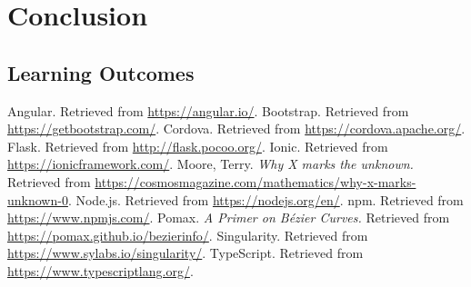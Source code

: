 \documentclass[12pt]{report}
\begin{document}
\chapter{Conclusion}
    \section{Learning Outcomes}

\begin{thebibliography}{9}
     Angular. Retrieved from \url{https://angular.io/}.
     Bootstrap. Retrieved from
        \url{https://getbootstrap.com/}.
     Cordova. Retrieved from \url{https://cordova.apache.org/}.
     Flask. Retrieved from \url{http://flask.pocoo.org/}.
     Ionic. Retrieved from \url{https://ionicframework.com/}.
     Moore, Terry. \textit{Why X marks the unknown.} Retrieved
        from \url{https://cosmosmagazine.com/mathematics/why-x-marks-unknown-0}.
     Node\@.js. Retrieved from \url{https://nodejs.org/en/}.
     npm. Retrieved from \url{https://www.npmjs.com/}.
     Pomax. \textit{A Primer on Bézier Curves.} Retrieved from
        \url{https://pomax.github.io/bezierinfo/}.
     Singularity. Retrieved from \url{https://www.sylabs.io/singularity/}.
     TypeScript. Retrieved from
        \url{https://www.typescriptlang.org/}.
\end{thebibliography}
\end{document}
